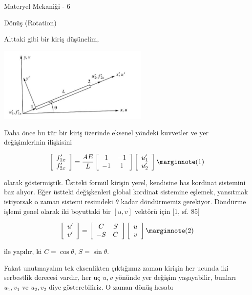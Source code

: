 \documentclass[12pt,fleqn]{article}\usepackage{../../common}
\begin{document}
Materyel Mekaniği - 6

Dönüş (Rotation)

Alttaki gibi bir kiriş düşünelim,

\includegraphics[width=20em]{phy_020_strs_06_01.jpg}

Daha önce bu tür bir kiriş üzerinde eksenel yöndeki kuvvetler ve yer
değişimlerinin ilişkisini

$$
\left[\begin{array}{c}
f'_{1x} \\ f'_{2x}
\end{array}\right] =
\frac{AE}{L}
\left[\begin{array}{cc}
1 & -1 \\ -1 & 1
\end{array}\right]
\left[\begin{array}{c}
u'_1 \\ u'_2
\end{array}\right]
\mlabel{1}
$$

olarak göstermiştik. Üstteki formül kirişin yerel, kendisine has kordinat
sistemini baz alıyor. Eğer üstteki değişkenleri global kordinat sistemine
eşlemek, yansıtmak istiyorsak o zaman sistemi resimdeki $\theta$ kadar döndürmemiz
gerekiyor. Döndürme işlemi genel olarak iki boyuttaki bir $[u, v]$ vektörü için
[1, sf. 85]

$$
\left[\begin{array}{c}
u' \\ v'
\end{array}\right] =
\left[\begin{array}{cc}
C & S \\ -S & C
\end{array}\right]
\left[\begin{array}{c}
u \\ v
\end{array}\right]
\mlabel{2}
$$

ile yapılır, ki $C = \cos\theta$, $S = \sin\theta$.

Fakat unutmayalım tek eksenlikten çıktığımız zaman kirişin her ucunda iki
serbestlik derecesi vardır, her uç $u,v$ yönünde yer değişim yaşayabilir,
bunları $u_1,v_1$ ve $u_2,v_2$ diye gösterebiliriz. O zaman dönüş hesabı
\end{document}

